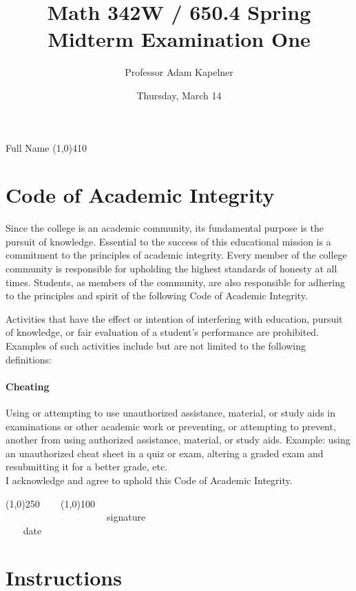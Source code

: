 \documentclass[12pt]{article}
\title{Math 342W / 650.4 Spring \the\year \\ Midterm Examination One \inred{Solutions}}
\author{Professor Adam Kapelner}
\date{Thursday, March 14}
\begin{document}
\maketitle

\noindent Full Name \line(1,0){410}

\thispagestyle{empty}

\section*{Code of Academic Integrity}

\footnotesize
Since the college is an academic community, its fundamental purpose is the pursuit of knowledge. Essential to the success of this educational mission is a commitment to the principles of academic integrity. Every member of the college community is responsible for upholding the highest standards of honesty at all times. Students, as members of the community, are also responsible for adhering to the principles and spirit of the following Code of Academic Integrity.

Activities that have the effect or intention of interfering with education, pursuit of knowledge, or fair evaluation of a student's performance are prohibited. Examples of such activities include but are not limited to the following definitions:

\paragraph{Cheating} Using or attempting to use unauthorized assistance, material, or study aids in examinations or other academic work or preventing, or attempting to prevent, another from using authorized assistance, material, or study aids. Example: using an unauthorized cheat sheet in a quiz or exam, altering a graded exam and resubmitting it for a better grade, etc.
\\

\noindent I acknowledge and agree to uphold this Code of Academic Integrity. \\

\begin{center}
\line(1,0){250} ~~~ \line(1,0){100}\\
~~~~~~~~~~~~~~~~~~~~~signature~~~~~~~~~~~~~~~~~~~~~~~~~~~~~~~~~~~~~~~~~~~~~ date
\end{center}

\normalsize

\section*{Instructions}
\end{document}
